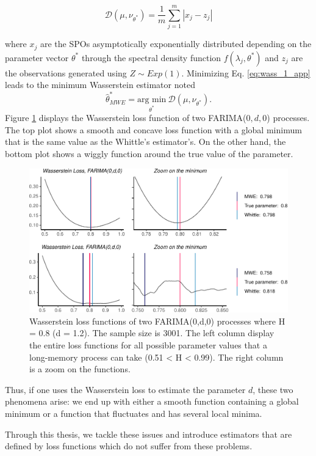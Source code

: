 \documentclass[
  11pt,
]{article}
\begin{document}
\begin{equation}
\mathcal{D}(\mu, \nu_{\theta^*}) = \frac{1}{m} \sum_{j = 1}^{m} |x_j - z_j| 
\label{eq:wass_1_app}
\end{equation}

where \(x_j\) are the SPOs asymptotically exponentially distributed
depending on the parameter vector \(\theta^*\) through the spectral
density function \(f(\lambda_j, \theta^*)\) and \(z_j\) are the
observations generated using \(Z \sim Exp(1)\). Minimizing Eq.
\ref{eq:wass_1_app} leads to the minimum Wasserstein estimator noted \[
\hat \theta^*_{MWE} = \underset{\theta^*}{\text{arg min}} \  \mathcal{D}(\mu, \nu_{\theta^*}).
\] Figure \ref{fig:wasserstein_farima} displays the Wasserstein loss
function of two FARIMA(\(0,d,0\)) processes. The top plot shows a smooth
and concave loss function with a global minimum that is the same value
as the Whittle's estimator's. On the other hand, the bottom plot shows a
wiggly function around the true value of the parameter.

\begin{figure}

{\centering \includegraphics[width=0.6\linewidth]{Master_thesis_V4_files/figure-latex/wasserstein_farima-1} 

}

\caption{Wasserstein loss functions of two FARIMA(0,d,0) processes where H = 0.8 (d = 1.2). The sample size is 3001. The left column display the entire loss functions for all possible parameter values that a long-memory process can take (0.51 < H < 0.99). The right column is a zoom on the functions.}\label{fig:wasserstein_farima}
\end{figure}

Thus, if one uses the Wasserstein loss to estimate the parameter \(d\),
these two phenomena arise: we end up with either a smooth function
containing a global minimum or a function that fluctuates and has
several local minima.

Through this thesis, we tackle these issues and introduce estimators
that are defined by loss functions which do not suffer from these
problems.
\end{document}
